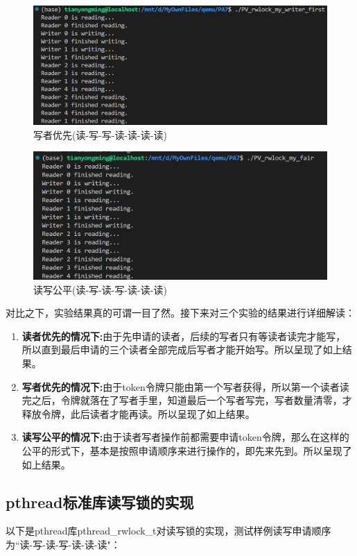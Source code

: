 \documentclass{LabReport}
\begin{document}
\begin{figure}[h!]
	\centering
	\includegraphics[width=0.85\linewidth]{figures/my_writer_first}
	\caption{写者优先(读-写-写-读-读-读-读)}
	\label{fig:mywriterfirst}
\end{figure}
	
\begin{figure}[h!]
	\centering
	\includegraphics[width=0.85\linewidth]{figures/my_reader_and_writer_fair}
	\caption{读写公平(读-写-读-写-读-读-读)}
	\label{fig:myreaderandwriterfair}
\end{figure}
	
	对比之下，实验结果真的可谓一目了然。接下来对三个实验的结果进行详细解读：
	\begin{enumerate}
		\item \textbf{读者优先的情况下:}由于先申请的读者，后续的写者只有等读者读完才能写，所以直到最后申请的三个读者全部完成后写者才能开始写。所以呈现了如上结果。
		\item \textbf{写者优先的情况下:}由于token令牌只能由第一个写者获得，所以第一个读者读完之后，令牌就落在了写者手里，知道最后一个写者写完，写者数量清零，才释放令牌，此后读者才能再读。所以呈现了如上结果。
		\item \textbf{读写公平的情况下:}由于读者写者操作前都需要申请token令牌，那么在这样的公平的形式下，基本是按照申请顺序来进行操作的，即先来先到。所以呈现了如上结果。
	\end{enumerate}
	
	\subsection{pthread标准库读写锁的实现}
	以下是pthread库pthread\_rwlock\_t对读写锁的实现，测试样例读写申请顺序为``读-写-读-写-读-读-读"：
	
\end{document}
